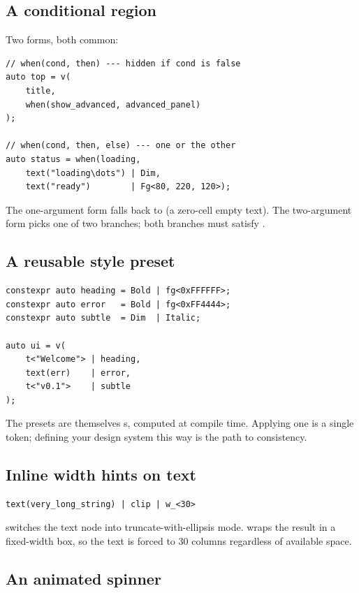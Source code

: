 \subsection{A conditional region}

Two forms, both common:

\begin{lstlisting}
// when(cond, then) --- hidden if cond is false
auto top = v(
    title,
    when(show_advanced, advanced_panel)
);

// when(cond, then, else) --- one or the other
auto status = when(loading,
    text("loading\dots") | Dim,
    text("ready")        | Fg<80, 220, 120>);
\end{lstlisting}

The one-argument form falls back to  (a
zero-cell empty text). The two-argument form picks one of two
branches; both branches must satisfy .

\subsection{A reusable style preset}

\begin{lstlisting}
constexpr auto heading = Bold | fg<0xFFFFFF>;
constexpr auto error   = Bold | fg<0xFF4444>;
constexpr auto subtle  = Dim  | Italic;

auto ui = v(
    t<"Welcome"> | heading,
    text(err)    | error,
    t<"v0.1">    | subtle
);
\end{lstlisting}

The presets are themselves s, computed at compile time.
Applying one is a single token; defining your design system this
way is the path to consistency.

\subsection{Inline width hints on text}

\begin{lstlisting}
text(very_long_string) | clip | w_<30>
\end{lstlisting}

 switches the text node into truncate-with-ellipsis
mode.  wraps the result in a fixed-width box, so the
text is forced to 30 columns regardless of available space.

\subsection{An animated spinner}

